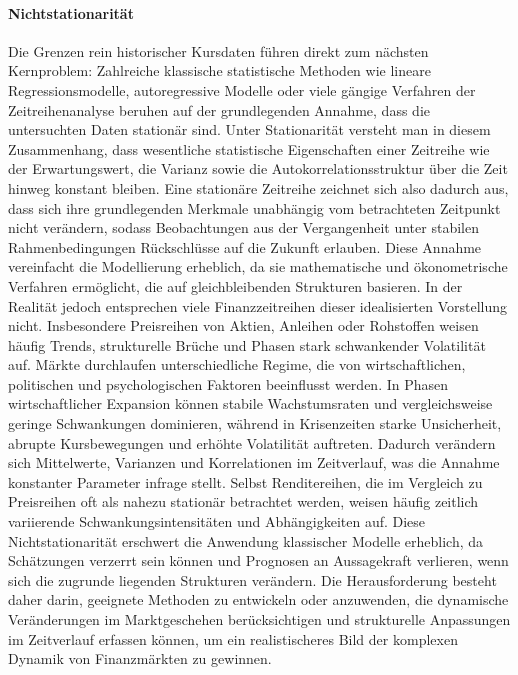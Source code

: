 \paragraph{Nichtstationarität} 
Die Grenzen rein historischer Kursdaten führen direkt zum nächsten Kernproblem: Zahlreiche klassische statistische Methoden wie lineare Regressionsmodelle, autoregressive Modelle oder viele gängige Verfahren der Zeitreihenanalyse beruhen auf der grundlegenden Annahme, dass die untersuchten Daten stationär sind. Unter Stationarität versteht man in diesem Zusammenhang, dass wesentliche statistische Eigenschaften einer Zeitreihe wie der Erwartungswert, die Varianz sowie die Autokorrelationsstruktur über die Zeit hinweg konstant bleiben. Eine stationäre Zeitreihe zeichnet sich also dadurch aus, dass sich ihre grundlegenden Merkmale unabhängig vom betrachteten Zeitpunkt nicht verändern, sodass Beobachtungen aus der Vergangenheit unter stabilen Rahmenbedingungen Rückschlüsse auf die Zukunft erlauben. Diese Annahme vereinfacht die Modellierung erheblich, da sie mathematische und ökonometrische Verfahren ermöglicht, die auf gleichbleibenden Strukturen basieren. In der Realität jedoch entsprechen viele Finanzzeitreihen dieser idealisierten Vorstellung nicht. Insbesondere Preisreihen von Aktien, Anleihen oder Rohstoffen weisen häufig Trends, strukturelle Brüche und Phasen stark schwankender Volatilität auf. Märkte durchlaufen unterschiedliche Regime, die von wirtschaftlichen, politischen und psychologischen Faktoren beeinflusst werden. In Phasen wirtschaftlicher Expansion können stabile Wachstumsraten und vergleichsweise geringe Schwankungen dominieren, während in Krisenzeiten starke Unsicherheit, abrupte Kursbewegungen und erhöhte Volatilität auftreten. Dadurch verändern sich Mittelwerte, Varianzen und Korrelationen im Zeitverlauf, was die Annahme konstanter Parameter infrage stellt. Selbst Renditereihen, die im Vergleich zu Preisreihen oft als nahezu stationär betrachtet werden, weisen häufig zeitlich variierende Schwankungsintensitäten und Abhängigkeiten auf. Diese Nichtstationarität erschwert die Anwendung klassischer Modelle erheblich, da Schätzungen verzerrt sein können und Prognosen an Aussagekraft verlieren, wenn sich die zugrunde liegenden Strukturen verändern. Die Herausforderung besteht daher darin, geeignete Methoden zu entwickeln oder anzuwenden, die dynamische Veränderungen im Marktgeschehen berücksichtigen und strukturelle Anpassungen im Zeitverlauf erfassen können, um ein realistischeres Bild der komplexen Dynamik von Finanzmärkten zu gewinnen.
